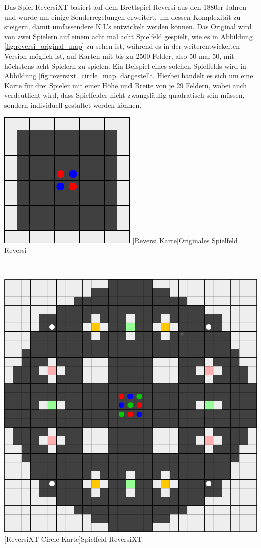 \documentclass[12pt,a4paper,bibliography=totocnumbered,listof=totocnumbered]{article}
\begin{document}
Das Spiel ReversiXT basiert auf dem Brettspiel Reversi aus den 1880er Jahren\cite{reversi} und wurde um einige Sonderregelungen erweitert, um dessen Komplexität zu steigern, damit umfassendere K.I.'s entwickelt werden können. Das Original wird von zwei Spielern auf einem acht mal acht Spielfeld gespielt, wie es in Abbildung \ref{fig:reversi_original_map} zu sehen ist, während es in der weiterentwickelten Version möglich ist, auf Karten mit bis zu 2500 Felder, also 50 mal 50, mit höchstens acht Spielern zu spielen. Ein Beispiel eines solchen Spielfelds wird in Abbildung \ref{fig:reversixt_circle_map} dargestellt. Hierbei handelt es sich um eine Karte für drei Spieler mit einer Höhe und Breite von je 29 Feldern, wobei auch verdeutlicht wird, dass Spielfelder nicht zwangsläufig quadratisch sein müssen, sondern individuell gestaltet werden können.

\vspace{1em}
\begin{minipage}{\linewidth}
	\centering
	\includegraphics[width=0.4\linewidth]{pics/reversi_original_map.png}
	[Reversi Karte]{Originales Spielfeld Reversi}
	\label{fig:reversi_original_map}
\end{minipage}
\\

\vspace{1em}
\begin{minipage}{\linewidth}
	\centering
	\includegraphics[width=0.7\linewidth]{pics/reversixt_circle_map.png}
	[ReversiXT Circle Karte]{Spielfeld ReversiXT}
	\label{fig:reversixt_circle_map}
\end{minipage}
\\
\end{document}

